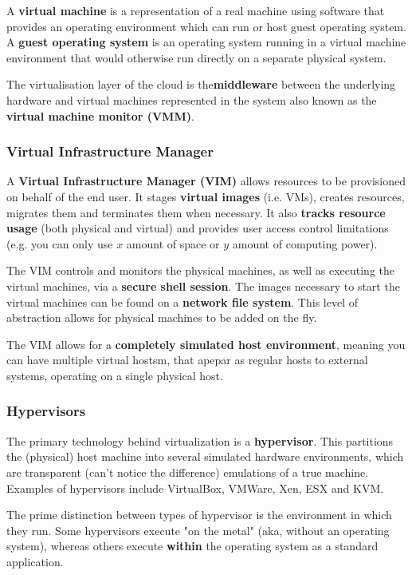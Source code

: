 \documentclass{article}
\begin{document}
A \textbf{virtual machine} is a representation of a real machine using software that provides an operating environment which can run or host guest operating system. A \textbf{guest operating system} is an operating system running in a virtual machine environment that would otherwise run directly on a separate physical system.

The virtualisation layer of the cloud is the\textbf{middleware} between the underlying hardware and virtual machines represented in the system also known as the \textbf{virtual machine monitor (VMM)}.

\subsubsection{Virtual Infrastructure Manager}

A \textbf{Virtual Infrastructure Manager (VIM)} allows resources to be provisioned on behalf of the end user. It stages \textbf{virtual images} (i.e. VMs), creates resources, migrates them and terminates them when necessary. It also \textbf{tracks resource usage} (both physical and virtual) and provides user access control limitations (e.g. you can only use $x$ amount of space or $y$ amount of computing power).

The VIM controls and monitors the physical machines, as well as executing the virtual machines, via a \textbf{secure shell session}. The images necessary to start the virtual machines can be found on a \textbf{network file system}. This level of abstraction allows for physical machines to be added on the fly.

The VIM allows for a \textbf{completely simulated host environment}, meaning you can have multiple virtual hostsm, that apepar as regular hosts to external systems, operating on a single physical host.

\subsubsection{Hypervisors}

The primary technology behind virtualization is a \textbf{hypervisor}. This partitions the (physical) host machine into several simulated hardware environments, which are transparent (can't notice the difference) emulations of a true machine. Examples of hypervisors include VirtualBox, VMWare, Xen, ESX and KVM.

The prime distinction between types of hypervisor is the environment in which they run. Some hypervisors execute "on the metal" (aka, without an operating system), whereas others execute \textbf{within} the operating system as a standard application.
\end{document}
